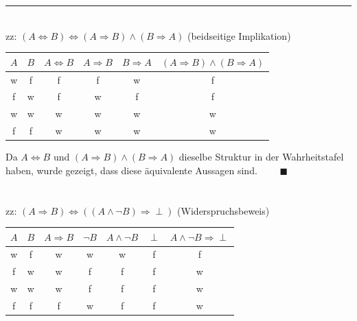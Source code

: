 \documentclass{article}
\begin{document}
\newpage


{\color{violet}
\hrule
	\\
	zz: $(A\Leftrightarrow B) \Leftrightarrow (A \Rightarrow B) \wedge (B \Rightarrow A)$ (beidseitige Implikation)
		\begin{table}[h]
			\centering
			\begin{tabular}{c|c||c||c|c|c}
				\hline\hline
					$A$ & $B$ & $A \Leftrightarrow B$ & $A \Rightarrow B$ & $B \Rightarrow A$ & $(A \Rightarrow B) \wedge (B \Rightarrow A)$ \\
				\hline
					w & f & f & f & w & f \\
					f & w & f & w & f & f \\
					w & w & w & w & w & w \\
					f & f & w & w & w & w \\
				\hline\hline
			\end{tabular}		
		\end{table}
	
	Da $A \Leftrightarrow B$ und $(A \Rightarrow B) \wedge (B \Rightarrow A)$ dieselbe Struktur in der Wahrheitstafel haben, wurde gezeigt, dass diese äquivalente Aussagen sind. $\qquad \blacksquare$\\
	\\
	\\
	zz: $(A\Rightarrow B) \Leftrightarrow ((A\wedge \neg B) \Rightarrow \perp)$ (Widerspruchsbeweis)
		\begin{table}[h]
			\centering
			\begin{tabular}{c|c||c||c|c|c|c}
				\hline\hline
					$A$ & $B$ & $A \Rightarrow B$ & $\neg B$ & $A \wedge \neg B$ & $\perp$ & $A \wedge \neg B \Rightarrow \perp$ \\
				\hline
					w & f & w & w & w & f & f \\
					f & w & w & f & f & f & w \\
					w & w & w & f & f & f & w \\
					f & f & f & w & f & f & w \\
				\hline\hline
			\end{tabular}		
		\end{table}
	
}
\end{document}
